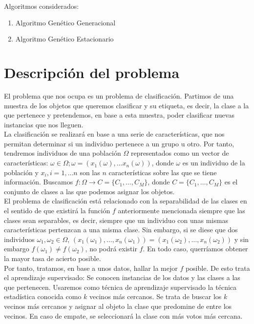 \documentclass[11pt,leqno]{article}
\begin{document}
Algoritmos considerados:
\begin{enumerate}
\item Algoritmo Genético Generacional
\item Algoritmo Genético Estacionario
\end{enumerate}

\newpage


\tableofcontents
\newpage

\section{Descripción del problema}

El problema que nos ocupa es un problema de clasificación. Partimos de una muestra de los objetos que queremos clasificar y su etiqueta, es decir, la clase a la que pertenece y pretendemos, en base a esta muestra, poder clasificar nuevas instancias que nos lleguen.\\
La clasificación se realizará en base a una serie de características, que nos permitan determinar si un individuo pertenece a un grupo u otro. Por tanto, tendremos individuos de una población $\Omega$ representados como un vector de características: $ \omega \in \Omega; \omega = (x_1(\omega), \dots x_n(\omega))$, donde $\omega$ es un individuo de la población y $x_i, i=1,\dots n$ son las $n$ características sobre las que se tiene información. Buscamos $f:\Omega \longrightarrow C=\{C_1, \dots, C_M\}$, donde $C=\{C_1, \dots, C_M\}$ es el conjunto de clases a las que podemos asignar los objetos.\\
El problema de clasificación está relacionado con la separabilidad de las clases en el sentido de que existirá la función $f$  anteriormente mencionada siempre que las clases sean separables, es decir, siempre que un individuo con unas mismas características pertenzcan a una misma clase. Sin embargo, si se diese que dos individuos $\omega_1, \omega_2 \in \Omega$, $(x_1(\omega_1), \dots, x_n(\omega_1))=(x_1(\omega_2), \dots, x_n(\omega_2))$ y sin embargo $f(\omega_1) \neq f(\omega_2)$, no podrá existir $f$. En todo caso, querríamos obtener la mayor tasa de acierto posible.\\  
Por tanto, tratamos, en base a unos datos, hallar la mejor $f$ posible. De esto trata el aprendizaje supervisado: Se conocen instancias de los datos y las clases a las que pertenecen. Usaremos como técnica de aprendizaje supervisado la técnica estadística conocida como $k$ vecinos más cercanos. Se trata de buscar los $k$ vecinos más cercanos y asignar al objeto la clase que predomine de entre los vecinos. En caso de empate, se seleccionará la clase con más votos más cercana.\\  
\end{document}
